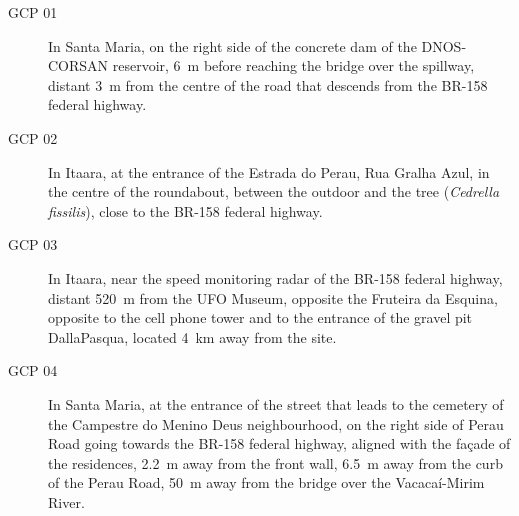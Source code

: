 \begin{description}
\item[GCP 01]
In Santa Maria, on the right side of the concrete dam of the DNOS-CORSAN reservoir, \SI{6}{\m} 
before reaching the bridge over the spillway, distant \SI{3}{\m} from the centre of the road that descends 
from the BR-158 federal highway.

\item[GCP 02]
In Itaara, at the entrance of the Estrada do Perau, Rua Gralha Azul, in the centre of the roundabout, between 
the outdoor and the tree (\textit{Cedrella fissilis}), close to the BR-158 federal highway.

\item[GCP 03]
In Itaara, near the speed monitoring radar of the BR-158 federal highway, distant \SI{520}{\m} from the UFO 
Museum, opposite the Fruteira da Esquina, opposite to the cell phone tower and to the entrance of the gravel 
pit DallaPasqua, located \SI{4}{\km} away from the site.

\item[GCP 04]
In Santa Maria, at the entrance of the street that leads to the cemetery of the Campestre do Menino Deus 
neighbourhood, on the right side of Perau Road going towards the BR-158 federal highway, aligned with the 
façade of the residences, \SI{2.2}{\m} away from the front wall, \SI{6.5}{\m} away from the curb of the Perau 
Road, \SI{50}{\m} away from the bridge over the Vacacaí-Mirim River.


\end{description}
